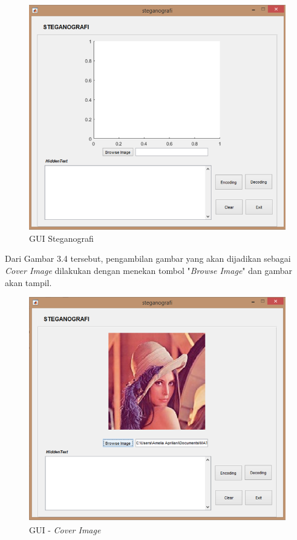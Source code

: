 	\begin{figure}[H]
		\centering
		\includegraphics[width=1\textwidth]{gambar/mockup/1}
		\caption{GUI Steganografi}
		\label{desain_form}
	\end{figure}

	Dari Gambar 3.4 tersebut, pengambilan gambar yang akan dijadikan sebagai \emph{Cover Image} dilakukan dengan menekan tombol "\emph{Browse Image}" dan gambar akan tampil. 
	
	\begin{figure}[H]
		\centering
		\includegraphics[width=1\textwidth]{gambar/mockup/2}
		\caption{GUI - \emph{Cover Image}}
		\label{desain_image}
	\end{figure}

